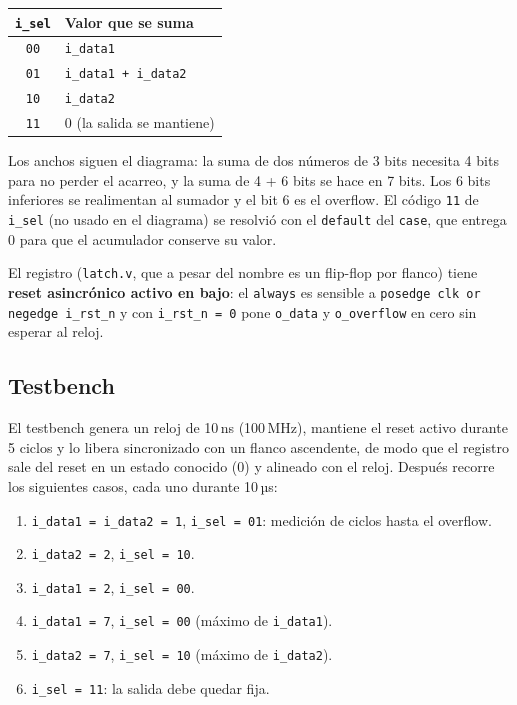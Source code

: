 \documentclass[11pt,a4paper]{scrartcl}
\newcommand{\sig}[1]{\texttt{#1}}
\begin{document}
	\begin{table}[H]
		\centering
		\begin{tabular}{@{}cl@{}}
			\toprule
			\sig{i\_sel} & Valor que se suma \\
			\midrule
			\sig{00} & \sig{i\_data1} \\
			\sig{01} & \sig{i\_data1 + i\_data2} \\
			\sig{10} & \sig{i\_data2} \\
			\sig{11} & 0 (la salida se mantiene) \\
			\bottomrule
		\end{tabular}
	\end{table}

	Los anchos siguen el diagrama: la suma de dos números de 3 bits necesita 4 bits para
	no perder el acarreo, y la suma de 4 + 6 bits se hace en 7 bits. Los 6 bits inferiores
	se realimentan al sumador y el bit 6 es el overflow. El código \sig{11} de
	\sig{i\_sel} (no usado en el diagrama) se resolvió con el \sig{default} del
	\sig{case}, que entrega 0 para que el acumulador conserve su valor.

	El registro (\sig{latch.v}, que a pesar del nombre es un flip-flop por flanco) tiene
	\textbf{reset asincrónico activo en bajo}: el \sig{always} es sensible a
	\sig{posedge clk or negedge i\_rst\_n} y con \sig{i\_rst\_n = 0} pone \sig{o\_data} y
	\sig{o\_overflow} en cero sin esperar al reloj.

	\subsection{Testbench}

	El testbench genera un reloj de 10\,ns (100\,MHz), mantiene el reset activo durante
	5 ciclos y lo libera sincronizado con un flanco ascendente, de modo que el registro sale
	del reset en un estado conocido (0) y alineado con el reloj. Después recorre los
	siguientes casos, cada uno durante 10\,µs:

	\begin{enumerate}
		\item \sig{i\_data1 = i\_data2 = 1}, \sig{i\_sel = 01}: medición de ciclos hasta el overflow.
		\item \sig{i\_data2 = 2}, \sig{i\_sel = 10}.
		\item \sig{i\_data1 = 2}, \sig{i\_sel = 00}.
		\item \sig{i\_data1 = 7}, \sig{i\_sel = 00} (máximo de \sig{i\_data1}).
		\item \sig{i\_data2 = 7}, \sig{i\_sel = 10} (máximo de \sig{i\_data2}).
		\item \sig{i\_sel = 11}: la salida debe quedar fija.
	\end{enumerate}
\end{document}

